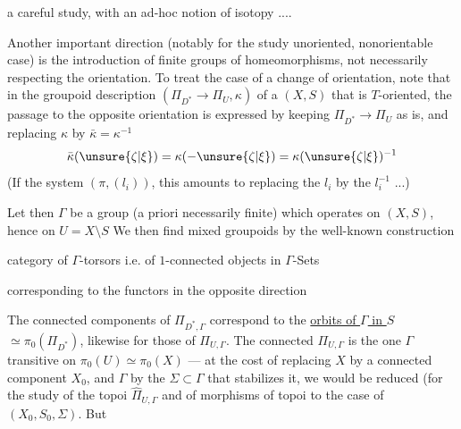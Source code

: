 
a careful study, with an
ad-hoc notion of isotopy ....

Another important direction (notably
for the study  unoriented,
nonorientable case) is the introduction of
finite groups of homeomorphisms, not
necessarily respecting the orientation.
To treat the case of a change of orientation,
note that in the groupoid description
$(\Pi_{D^*}\longrightarrow\Pi_U,\kappa)$ of a $(X,S)$ that is $T$-oriented,
the passage to the opposite orientation is expressed by
keeping $\Pi_{D^*}\longrightarrow\Pi_U$ as is, and
replacing $\kappa$ by $\bar\kappa=\kappa^{-1}$
\[
\bar\kappa(\unsure{\zeta|\xi})=\kappa(-\unsure{\zeta|\xi})=\kappa(\unsure{\zeta|\xi})^{-1}
\]
(If  the system $(\pi,(l_i))$, this amounts to
replacing the $l_i$ by the $l_i^{-1}$ ...)

Let then $\Gamma$ be a group (a priori
 necessarily finite) which operates on $(X,S)$, hence
on $U=X\setminus S$  We then find
mixed  groupoids  by the well-known construction


category of $\Gamma$-torsors
i.e. of $1$-connected objects
in $\Gamma$-Sets

corresponding to the functors in the opposite direction


The connected components of $\Pi_{D^*,\Gamma}$ correspond
to the \uline{orbits of $\Gamma$ in $S$}  $\simeq\pi_0(\Pi_{D^*})$,
likewise for those of $\Pi_{U,\Gamma}$. The 
connected $\Pi_{U,\Gamma}$ 
is the one  $\Gamma$ transitive
on $\pi_0(U)\simeq\pi_0(X)$ --- at the cost of replacing
$X$ by a connected component $X_0$, and $\Gamma$
by the  $\Sigma\subset\Gamma$ that stabilizes it,
we would be reduced (for the study of the
topoi $\widehat\Pi_{U,\Gamma}$ and of morphisms of topoi
to the case of $(X_0,S_0,\Sigma)$. But 

